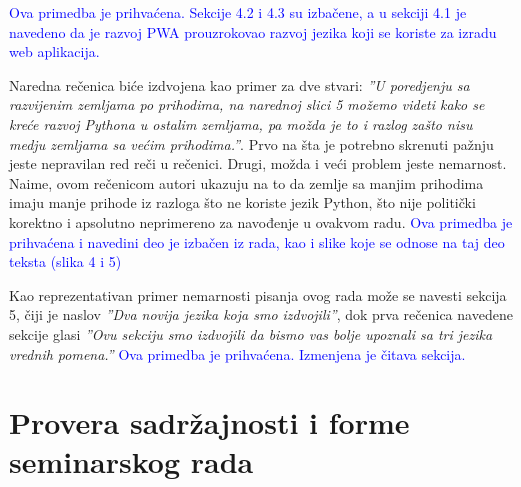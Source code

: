 \documentclass[a4paper]{report}
\newcommand{\odgovor}[1]{\textcolor{blue}{#1}}
\begin{document}
\odgovor{Ova primedba je prihvaćena. Sekcije 4.2 i 4.3 su izbačene, a u sekciji 4.1 je navedeno da je razvoj PWA prouzrokovao razvoj jezika koji se koriste za izradu web aplikacija.}
\par Naredna rečenica biće izdvojena kao primer za dve stvari: \textit{''U poredjenju sa razvijenim zemljama po prihodima, na narednoj slici 5 možemo videti kako se kreće razvoj Pythona u ostalim zemljama, pa možda je to i razlog zašto nisu medju zemljama sa većim prihodima.''}. Prvo na šta je potrebno skrenuti pažnju jeste nepravilan red reči u rečenici. Drugi, možda i veći problem jeste nemarnost. Naime, ovom rečenicom autori ukazuju na to da zemlje sa manjim prihodima imaju manje prihode iz razloga što ne koriste jezik Python, što nije politički korektno i apsolutno neprimereno za navođenje u ovakvom radu. 
\odgovor{Ova primedba je prihvaćena i navedini deo je izbačen iz rada, kao i slike koje se odnose na taj deo teksta (slika 4 i 5)}\par
Kao reprezentativan primer nemarnosti pisanja ovog rada može se navesti sekcija 5, čiji je naslov \textit{''Dva novija jezika koja smo izdvojili''}, dok prva rečenica navedene sekcije glasi \textit{''Ovu sekciju smo izdvojili da bismo vas bolje upoznali sa tri jezika vrednih pomena.''}
\odgovor{Ova primedba je prihvaćena. Izmenjena je čitava sekcija.}

\section{Provera sadržajnosti i forme seminarskog rada}
\end{document}
